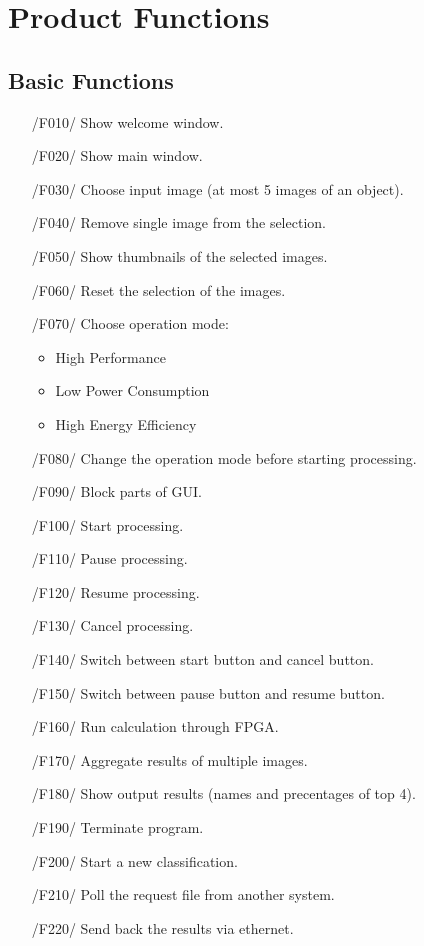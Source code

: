 \documentclass[parskip=full]{scrartcl}
\begin{document}
\pagebreak





\section{Product Functions} \label {pfunc}

\subsection{Basic Functions} \label {bfunc}

\begin{itemize}
	\item[/F010/] Show welcome window.
	\item[/F020/] Show main window. 
	\item[/F030/] Choose input image (at most 5 images of an object).
	\item[/F040/] Remove single image from the selection.
	\item[/F050/] Show thumbnails of the selected images.
	\item[/F060/] Reset the selection of the images.
	\item[/F070/] Choose operation mode: 
	\begin{itemize}
		\item High Performance
		\item Low Power Consumption
		\item High Energy Efficiency
	\end{itemize}
	\item[/F080/] Change the operation mode before starting processing.
	\item[/F090/] Block parts of GUI.
	\item[/F100/] Start processing.
	\item[/F110/] Pause processing.
	\item[/F120/] Resume processing.
	\item[/F130/] Cancel processing.
	\item[/F140/] Switch between start button and cancel button.
	\item[/F150/] Switch between pause button and resume button.
	\item[/F160/] Run calculation through FPGA.
	\item[/F170/] Aggregate results of multiple images.
	\item[/F180/] Show output results (names and precentages of top 4).
	\item[/F190/] Terminate program.
	\item[/F200/] Start a new classification.
	\item[/F210/] Poll the request file from another system.
	\item[/F220/] Send back the results via ethernet.
\end{itemize}
\end{document}
